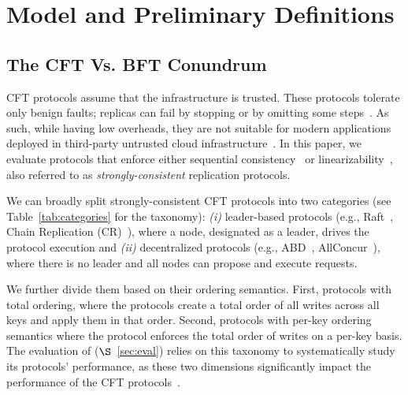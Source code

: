 \section{Model and Preliminary Definitions}
\label{sec:design}

\subsection{The CFT Vs. BFT Conundrum}
\label{sec:background:CFT}




CFT protocols assume that the infrastructure is trusted. These protocols tolerate only benign faults; replicas can fail by stopping or by omitting some steps~\cite{delporte}. As such, while having low overheads, they are not suitable for modern applications deployed in third-party untrusted cloud infrastructure~\cite{10.1145/3190508.3190538}. In this paper, we evaluate protocols that enforce either sequential consistency~\cite{1675439} or linearizability~\cite{Herlihy:1990}, also referred to as \emph{strongly-consistent} replication protocols.




We can broadly split strongly-consistent CFT protocols into two categories (see Table~\ref{tab:categories} for the taxonomy):  \emph{(i)} leader-based protocols (e.g., Raft~\cite{raft}, Chain Replication (CR)~\cite{chain-replication}), where a node, designated as a leader, drives the protocol execution and \emph{(ii)} decentralized protocols (e.g., ABD~\cite{lynch:1997},  AllConcur~\cite{Poke2016AllConcurLC}), where there is no leader and all nodes can propose and execute requests. 

We further divide them based on their ordering semantics. First, protocols with total ordering, where the protocols create a total order of all writes across all keys and apply them in that order. Second, protocols with per-key ordering semantics where the protocol enforces the total order of writes on a per-key basis. The evaluation of \projecttitle{} ($\S$~\ref{sec:eval}) relies on this taxonomy to systematically study its protocols' performance, as these two dimensions significantly impact the performance of the CFT protocols~\cite{f04eb9b864204bab958e72055062748c}. %

